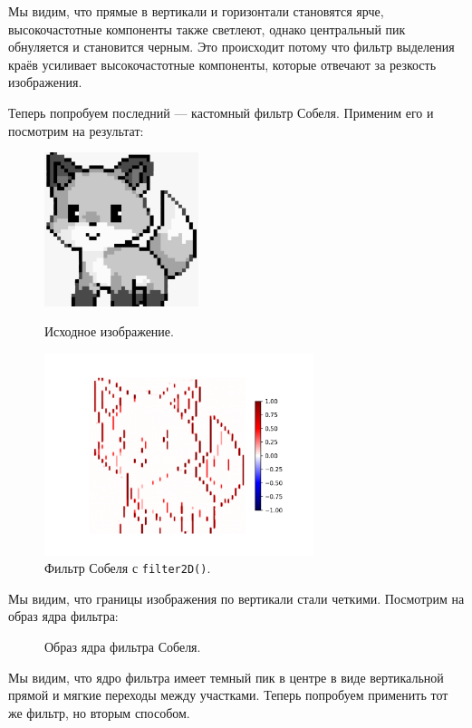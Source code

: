 \documentclass[a4paper]{article}
\begin{document}
\noindent Мы видим, что прямые в вертикали и горизонтали становятся ярче, высокочастотные компоненты также светлеют, однако центральный пик обнуляется и становится черным. Это происходит потому что фильтр выделения краёв усиливает высокочастотные компоненты, которые отвечают за резкость изображения.

Теперь попробуем последний — кастомный фильтр Собеля. Применим его и посмотрим на результат:
\begin{figure}[H]
  \centering
  \includegraphics[width=0.4\textwidth]{src/grayscale.png}
  \caption{Исходное изображение.}  
  \includegraphics[width=0.7\textwidth]{src/custom.png}
  \caption{Фильтр Собеля с \texttt{filter2D()}.}
\end{figure}
\noindent Мы видим, что границы изображения по вертикали стали четкими. Посмотрим на образ ядра фильтра:
\begin{figure}[H]
  \centering
  
  \caption{Образ ядра фильтра Собеля.}
\end{figure}  
\noindent Мы видим, что ядро фильтра имеет темный пик в центре в виде вертикальной прямой и мягкие переходы между участками. Теперь попробуем применить тот же фильтр, но вторым способом. 
\end{document}
